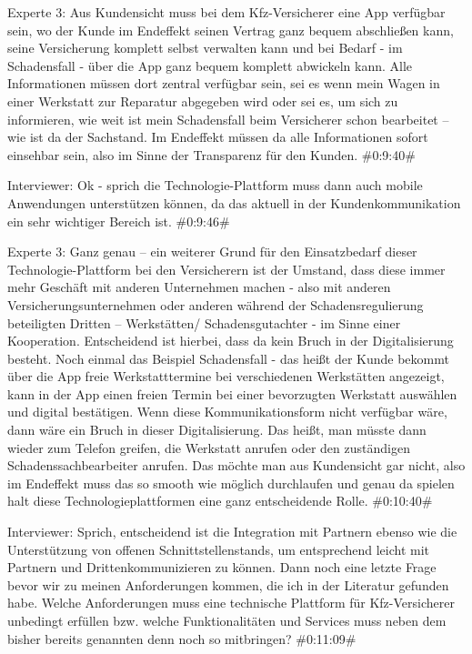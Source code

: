 Experte 3:
Aus Kundensicht muss bei dem Kfz-Versicherer eine App verfügbar sein, wo der Kunde im Endeffekt seinen Vertrag ganz bequem abschließen kann, seine Versicherung komplett selbst verwalten kann und bei Bedarf - im Schadensfall - über die App ganz bequem komplett abwickeln kann. Alle Informationen müssen dort zentral verfügbar sein, sei es wenn mein Wagen in einer Werkstatt zur Reparatur abgegeben wird oder sei es, um sich zu informieren, wie weit ist mein Schadensfall beim Versicherer schon bearbeitet – wie ist da der Sachstand. Im Endeffekt müssen da alle Informationen sofort einsehbar sein, also im Sinne der Transparenz für den Kunden.
\#0:9:40\#

Interviewer:
Ok - sprich die Technologie-Plattform muss dann auch mobile Anwendungen unterstützen können, da das aktuell in der Kundenkommunikation ein sehr wichtiger Bereich ist.
\#0:9:46\#

Experte 3:
Ganz genau – ein weiterer Grund für den Einsatzbedarf dieser Technologie-Plattform bei den Versicherern ist der Umstand, dass diese immer mehr Geschäft mit anderen Unternehmen machen - also mit anderen Versicherungsunternehmen oder anderen während der Schadensregulierung beteiligten Dritten – Werkstätten/ Schadensgutachter - im Sinne einer Kooperation. Entscheidend ist hierbei, dass da kein Bruch in der Digitalisierung besteht. Noch einmal das Beispiel Schadensfall - das heißt der Kunde bekommt über die App freie Werkstatttermine bei verschiedenen Werkstätten angezeigt, kann in der App einen freien Termin bei einer bevorzugten Werkstatt auswählen und digital bestätigen. Wenn diese Kommunikationsform nicht verfügbar wäre, dann wäre ein Bruch in dieser Digitalisierung. Das heißt, man müsste dann wieder zum Telefon greifen, die Werkstatt anrufen oder den zuständigen Schadenssachbearbeiter anrufen. Das möchte man aus Kundensicht gar nicht, also im Endeffekt muss das so smooth wie möglich durchlaufen und genau da spielen halt diese Technologieplattformen eine ganz entscheidende Rolle.
\#0:10:40\#

Interviewer:
Sprich, entscheidend ist die Integration mit Partnern ebenso wie die Unterstützung von offenen Schnittstellenstands, um entsprechend leicht mit Partnern und Drittenkommunizieren zu können. Dann noch eine letzte Frage bevor wir zu meinen Anforderungen kommen, die ich in der Literatur gefunden habe. Welche Anforderungen muss eine technische Plattform für Kfz-Versicherer unbedingt erfüllen bzw. welche Funktionalitäten und Services muss neben dem bisher bereits genannten denn noch so mitbringen?
\#0:11:09\#

